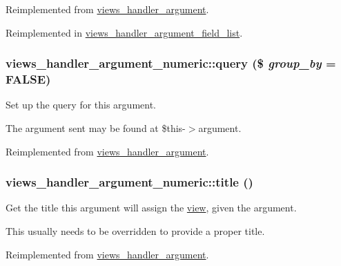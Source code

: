 Reimplemented from \hyperlink{classviews__handler__argument_a44f015a0d527983ae6df2689f66b2c24}{views\_\-handler\_\-argument}.

Reimplemented in \hyperlink{classviews__handler__argument__field__list_a8fd9b838e00ade74124ff96dbfce439c}{views\_\-handler\_\-argument\_\-field\_\-list}.\hypertarget{classviews__handler__argument__numeric_aae525ea5d6722ebf04d1fa21f79a1a5b}{
\subsubsection[{query}]{\setlength{\rightskip}{0pt plus 5cm}views\_\-handler\_\-argument\_\-numeric::query (\$ {\em group\_\-by} = {\ttfamily FALSE})}}
\label{classviews__handler__argument__numeric_aae525ea5d6722ebf04d1fa21f79a1a5b}
Set up the query for this argument.

The argument sent may be found at \$this-\/$>$argument. 

Reimplemented from \hyperlink{classviews__handler__argument_af9ddabf5d386782c8ffc5785b7ae4263}{views\_\-handler\_\-argument}.\hypertarget{classviews__handler__argument__numeric_a480758dbcde899b5483b091e51e2bf39}{
\subsubsection[{title}]{\setlength{\rightskip}{0pt plus 5cm}views\_\-handler\_\-argument\_\-numeric::title ()}}
\label{classviews__handler__argument__numeric_a480758dbcde899b5483b091e51e2bf39}
Get the title this argument will assign the \hyperlink{classview}{view}, given the argument.

This usually needs to be overridden to provide a proper title. 

Reimplemented from \hyperlink{classviews__handler__argument_a76181ac24e7be4a09aaafc1fa5f15ea1}{views\_\-handler\_\-argument}.

